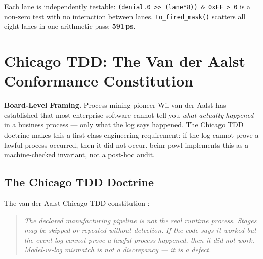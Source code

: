 \documentclass[12pt,a4paper]{article}
\theoremstyle{definition}
\theoremstyle{remark}
\newcommand{\execinsight}[2]{%
  \begin{execbox}
    \textbf{\color{chatblue}#1}\quad #2
  \end{execbox}}
\begin{document}
\begin{center}
\end{center}

Each lane is independently testable: \texttt{(denial.0 >> (lane*8)) \& 0xFF > 0}
is a non-zero test with no interaction between lanes.
\texttt{to\_fired\_mask()} scatters all eight lanes in one arithmetic pass: \textbf{591\,ps}.

\section{Chicago TDD: The Van der Aalst Conformance Constitution}
\label{sec:chicago}

\execinsight{Board-Level Framing.}{%
Process mining pioneer Wil van der Aalst has established that most enterprise
software cannot tell you \emph{what actually happened} in a business process ---
only what the log says happened.
The Chicago TDD doctrine makes this a first-class engineering requirement:
if the log cannot prove a lawful process occurred, then it did not occur.
bcinr-powl implements this as a machine-checked invariant, not a post-hoc audit.}

\subsection{The Chicago TDD Doctrine}

The van der Aalst Chicago TDD constitution \citep{vanderjest2024chicago}:
\begin{quote}
\emph{The declared manufacturing pipeline is not the real runtime process.
Stages may be skipped or repeated without detection.
If the code says it worked but the event log cannot prove a lawful process happened,
then it did not work.
Model-vs-log mismatch is not a discrepancy --- it is a defect.}
\end{quote}
\end{document}
